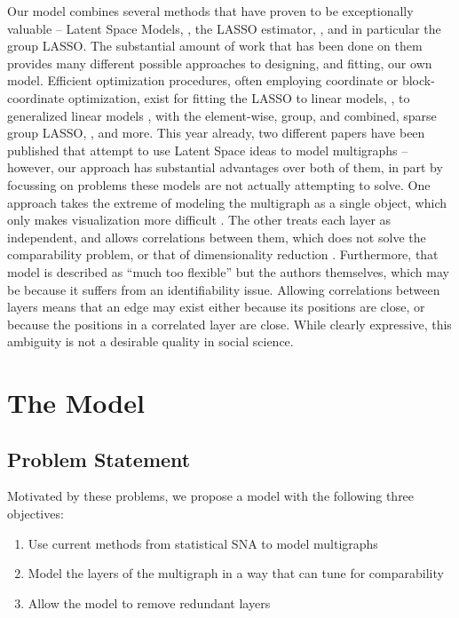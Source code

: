 \documentclass{article}
\begin{document}
Our model combines several methods that have proven to be exceptionally valuable -- Latent Space Models, \cite{hoff-2002}, the LASSO estimator, \cite{Friedman2008}, and in particular the group LASSO. The substantial amount of work that has been done on them provides many different possible approaches to designing, and fitting, our own model. Efficient optimization procedures, often employing coordinate or block-coordinate optimization, exist for fitting the LASSO to linear models, \cite{Friedman2008}, to generalized linear models \cite{Friedman2010}, with the element-wise, group, and combined, sparse group LASSO, \cite{Vincent, Qin, Wu2008}, and more. This year already, two different papers have been published that attempt to use Latent Space ideas to model multigraphs -- however, our approach has substantial advantages over both of them, in part by focussing on problems these models are not actually attempting to solve. One approach takes the extreme of modeling the multigraph as a single object, which only makes visualization more difficult \cite{gollini-2016}. The other treats each layer as independent, and allows correlations between them, which does not solve the comparability problem, or that of dimensionality reduction \cite{salter-townshend2017}. Furthermore, that model is described as ``much too flexible'' but the authors themselves, which may be because it suffers from an identifiability issue. Allowing correlations between layers means that an edge may exist either because its positions are close, or because the positions in a correlated layer are close. While clearly expressive, this ambiguity is not a desirable quality in social science.



\section{The Model}
\subsection{Problem Statement}
Motivated by these problems, we propose a model with the following three objectives:

\begin{enumerate}
\item Use current methods from statistical SNA to model multigraphs
\item Model the layers of the multigraph in a way that can tune for comparability
\item Allow the model to remove redundant layers
\end{enumerate}
\end{document}
